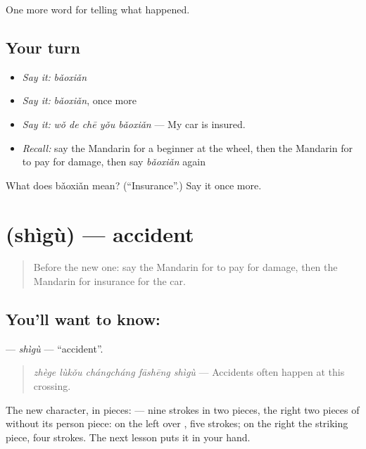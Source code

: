 \begin{grammarlens}[title={What you've built}]
One more word for telling what happened.
\end{grammarlens}

\subsection*{Your turn}
\begin{itemize}
\raggedright
  \item \emph{Say it:} \emph{bǎoxiǎn}
  \item \emph{Say it:} \emph{bǎoxiǎn}, once more
  \item \emph{Say it:} \emph{wǒ de chē yǒu bǎoxiǎn} — My car is insured.
  \item \emph{Recall:} say the Mandarin for a beginner at the wheel, then the Mandarin for to pay for damage, then say \emph{bǎoxiǎn} again
\end{itemize}

\begin{tcolorbox}[breakable,colback=teal!4,colframe=teal!35!black,title={Before you move on}]
What does bǎoxiǎn mean? (\textquotedblleft{}Insurance\textquotedblright{}.) Say it once more.
\end{tcolorbox}
\section[\texorpdfstring{\zh{事故} (shìgù)}{事故 (shìgù)}]{ (shìgù) — accident}

\label{lesson:ZH-C297-shigu}



\begin{quote}
Before the new one: say the Mandarin for to pay for damage, then the Mandarin for insurance for the car.
\end{quote}

\subsection*{You'll want to know: }
\textbf{} — \emph{shìgù} — \textquotedblleft{}accident\textquotedblright{}.

\begin{quote}
\textbf{} \emph{zhège lùkǒu chángcháng fāshēng shìgù} — Accidents often happen at this crossing.
\end{quote}

The new character, in pieces:  — nine strokes in two pieces, the right two pieces of  without its person piece: on the left  over , five strokes; on the right the striking piece, four strokes. The next lesson puts it in your hand.

